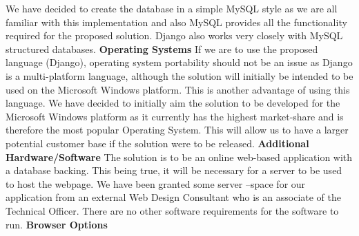 We have decided to create the database in a simple MySQL style as we are all familiar with this implementation and also MySQL provides all the functionality required for the proposed solution. Django also works very closely with MySQL structured databases.
\newline
\newline
\textbf{Operating Systems}
\newline
\newline
If we are to use the proposed language (Django), operating system portability should not be an issue as Django is a multi-platform language, although the solution will initially be intended to be used on the Microsoft Windows platform. This is another advantage of using this language.
We have decided to initially aim the solution to be developed for the Microsoft Windows platform as it currently has the highest market-share and is therefore the most popular Operating System. This will allow us to have a larger potential customer base if the solution were to be released. 
\newline
\newline
\textbf{Additional Hardware/Software}
\newline
\newline
The solution is to be an online web-based application with a database backing. This being true, it will be necessary for a server to be used to host the webpage. We have been granted some server –space for our application from an external Web Design Consultant who is an associate of the Technical Officer.
There are no other software requirements for the software to run.
\newline
\newline
\textbf{Browser Options}
\newline
\newline

